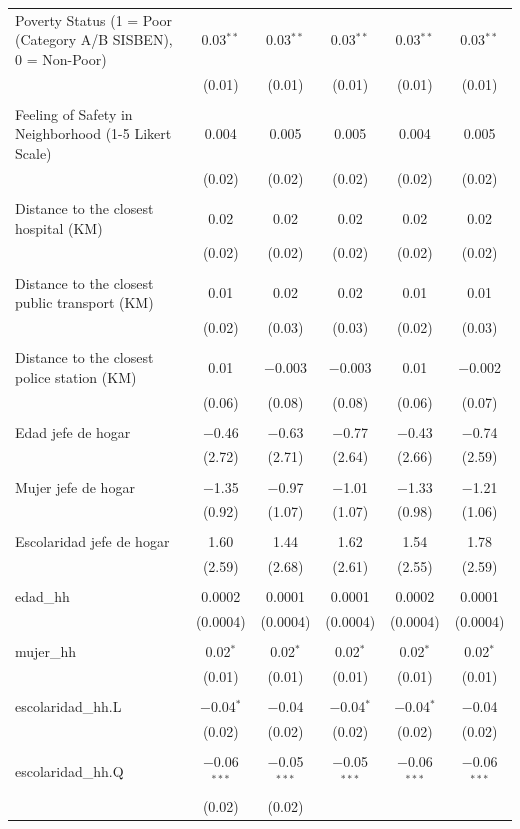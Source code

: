 \begin{table}[H]
\begin{tabularx}{0.9\textwidth}{@{\extracolsep{-7pt}}lccccc}
 Poverty Status (1 = Poor (Category A/B SISBEN), 0 = Non-Poor) & 0.03$^{**}$ & 0.03$^{**}$ & 0.03$^{**}$ & 0.03$^{**}$ & 0.03$^{**}$ \\    & (0.01) & (0.01) & (0.01) & (0.01) & (0.01) \\    & & & & & \\   Feeling of Safety in Neighborhood (1-5 Likert Scale) & 0.004 & 0.005 & 0.005 & 0.004 & 0.005 \\    & (0.02) & (0.02) & (0.02) & (0.02) & (0.02) \\    & & & & & \\   Distance to the closest hospital (KM) & 0.02 & 0.02 & 0.02 & 0.02 & 0.02 \\    & (0.02) & (0.02) & (0.02) & (0.02) & (0.02) \\    & & & & & \\   Distance to the closest public transport  (KM) & 0.01 & 0.02 & 0.02 & 0.01 & 0.01 \\    & (0.02) & (0.03) & (0.03) & (0.02) & (0.03) \\    & & & & & \\   Distance to the closest police station (KM) & 0.01 & $-$0.003 & $-$0.003 & 0.01 & $-$0.002 \\    & (0.06) & (0.08) & (0.08) & (0.06) & (0.07) \\    & & & & & \\   Edad jefe de hogar & $-$0.46 & $-$0.63 & $-$0.77 & $-$0.43 & $-$0.74 \\    & (2.72) & (2.71) & (2.64) & (2.66) & (2.59) \\    & & & & & \\   Mujer jefe de hogar & $-$1.35 & $-$0.97 & $-$1.01 & $-$1.33 & $-$1.21 \\    & (0.92) & (1.07) & (1.07) & (0.98) & (1.06) \\    & & & & & \\   Escolaridad jefe de hogar & 1.60 & 1.44 & 1.62 & 1.54 & 1.78 \\    & (2.59) & (2.68) & (2.61) & (2.55) & (2.59) \\    & & & & & \\   edad\_hh & 0.0002 & 0.0001 & 0.0001 & 0.0002 & 0.0001 \\    & (0.0004) & (0.0004) & (0.0004) & (0.0004) & (0.0004) \\    & & & & & \\   mujer\_hh & 0.02$^{*}$ & 0.02$^{*}$ & 0.02$^{*}$ & 0.02$^{*}$ & 0.02$^{*}$ \\    & (0.01) & (0.01) & (0.01) & (0.01) & (0.01) \\    & & & & & \\   escolaridad\_hh.L & $-$0.04$^{*}$ & $-$0.04 & $-$0.04$^{*}$ & $-$0.04$^{*}$ & $-$0.04 \\    & (0.02) & (0.02) & (0.02) & (0.02) & (0.02) \\    & & & & & \\   escolaridad\_hh.Q & $-$0.06$^{***}$ & $-$0.05$^{***}$ & $-$0.05$^{***}$ & $-$0.06$^{***}$ & $-$0.06$^{***}$ \\    & (0.02) & (0.02) & 
\end{tabularx}
\end{table}
